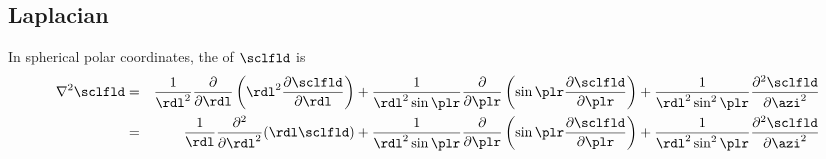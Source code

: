 \documentclass[12pt,twoside]{book}
\begin{document}
\subsection[Laplacian]{Laplacian}\label{sxn:lpl_sph}
In spherical polar coordinates, the  of $\sclfld$ is 
\begin{eqnarray}
\nabla^{2} \sclfld & = & 
\frac{1}{\rdl^{2}} \frac{\partial}{\partial \rdl} 
\left( \rdl^{2} \frac{\partial \sclfld}{\partial \rdl} \right) +
\frac{1}{\rdl^{2} \sin \plr} \frac{\partial}{\partial \plr}
\left( \sin \plr \frac{\partial \sclfld}{\partial \plr} \right) + 
\frac{1}{\rdl^{2} \sin^{2} \plr} \frac{\partial^{2} \sclfld}{\partial \azi^{2}}
\nonumber \\
 & = & 
\frac{1}{\rdl} \frac{\partial^{2}}{\partial \rdl^{2}} ( \rdl \sclfld ) +
\frac{1}{\rdl^{2} \sin \plr} \frac{\partial}{\partial \plr}
\left( \sin \plr \frac{\partial \sclfld}{\partial \plr} \right) + 
\frac{1}{\rdl^{2} \sin^{2} \plr} \frac{\partial^{2} \sclfld}{\partial \azi^{2}}
\label{eqn:lpl_sph_plr_scl}
\end{eqnarray}
\end{document}
